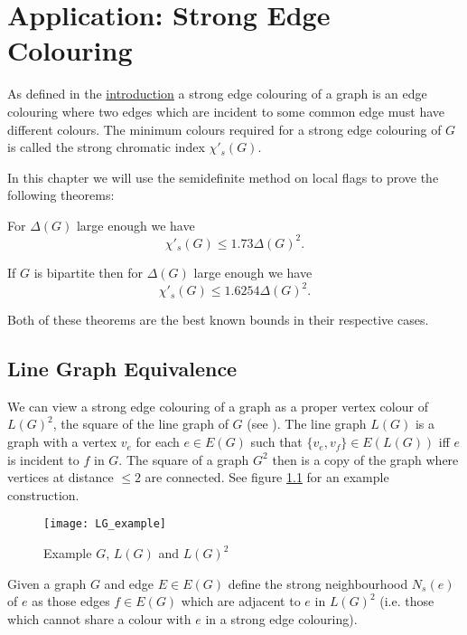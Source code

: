 \chapter{Application: Strong Edge Colouring}
\label{chap:strong_edge_colouring}

As defined in the \hyperref[sec:intro_strong_edge_coloring]{introduction}
a strong edge colouring of a graph is an edge colouring where two edges which are incident to some
common edge must have different colours. The minimum colours required for a strong edge colouring of
$G$ is called the strong chromatic index $\chi'_s(G)$.

In this chapter we will use the semidefinite method on local flags to prove the following
theorems:
\begin{knowntheorem}
    For $\Delta(G)$ large enough we have
    \[\chi'_s(G) \leq 1.73\Delta(G)^2.\]
\end{knowntheorem}
\begin{knowntheorem}
    If $G$ is bipartite then for $\Delta(G)$ large enough we have
    \[\chi'_s(G) \leq 1.6254\Delta(G)^2.\]
\end{knowntheorem}
Both of these theorems are the best known bounds in their respective cases.


\section{Line Graph Equivalence}

We can view a strong edge colouring of a graph as a proper vertex colour of $L(G)^2$, the
square of the line graph of $G$ (see \cite{molloyBoundStrongChromatic1997}).
The line graph $L(G)$ is a graph with a vertex $v_e$ for
each $e\in E(G)$ such that $\{v_e, v_f\} \in E(L(G))$ iff $e$ is incident to $f$ in
$G$. The square of a graph $G^2$ then is a copy of the graph where vertices at distance $\leq 2$
are connected. See figure \ref{fig:lg_example} for an example construction.

\begin{figure}[ht]
    \centering
    \texttt{[image: LG\_example]}
    \caption{Example $G$, $L(G)$ and $L(G)^2$}
    \label{fig:lg_example}
\end{figure}

\begin{definition}
    Given a graph $G$ and edge $E \in E(G)$ define the strong neighbourhood
    $N_s(e)$ of $e$ as those edges $f \in E(G)$ which are adjacent to $e$ in 
    $L(G)^2$ (i.e. those which cannot share a colour with $e$ in a strong edge colouring).
\end{definition}

